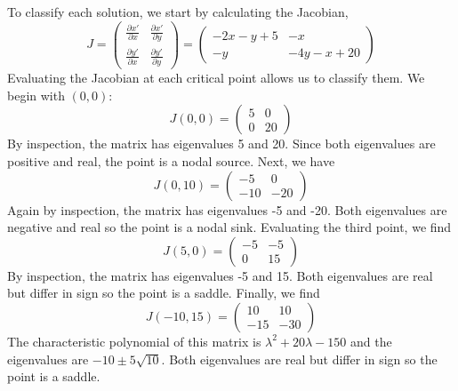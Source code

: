 \documentclass[11pt, titlepage]{article}
\begin{document}
\begin{solution}
        To classify each solution, we start by calculating the Jacobian,
        \[
        J = 
        \begin{pmatrix}
            \frac{\partial x'}{\partial x} & \frac{\partial x'}{\partial y}
            \\[1ex]
            \frac{\partial y'}{\partial x} & \frac{\partial y'}{\partial y}
        \end{pmatrix} = 
        \begin{pmatrix}
            -2x-y+5 & -x \\
            -y & -4y-x+20
        \end{pmatrix}
        \] 
        Evaluating the Jacobian at each critical point allows us to classify
        them. We begin with $(0, 0)$:
        \[
            J(0, 0) = 
            \begin{pmatrix}
                5 & 0 \\
                0 & 20
            \end{pmatrix}
        \] 
        By inspection, the matrix has eigenvalues 5 and 20. Since both
        eigenvalues are positive and real, the point is a nodal source.
        Next, we have
        \[
            J(0, 10) = 
            \begin{pmatrix}
                -5 & 0 \\
                -10 & -20
            \end{pmatrix}
        \] 
        Again by inspection, the matrix has eigenvalues -5 and -20. Both
        eigenvalues are negative and real so the point is a nodal sink.
        Evaluating the third point, we find
        \[
            J(5, 0) = 
            \begin{pmatrix}
                -5 & -5 \\
                0 & 15
            \end{pmatrix}
        \] 
        By inspection, the matrix has eigenvalues -5 and 15. Both eigenvalues
        are real but differ in sign so the point is a saddle.
        Finally, we find
        \[
            J(-10, 15) = 
            \begin{pmatrix}
                10 & 10 \\
                -15 & -30
            \end{pmatrix}
        \] 
        The characteristic polynomial of this matrix is $\lambda^2 + 20\lambda -
        150$ and the eigenvalues are $-10 \pm 5 \sqrt{10}$. Both eigenvalues are
        real but differ in sign so the point is a saddle.
    \end{solution}
\end{document}
